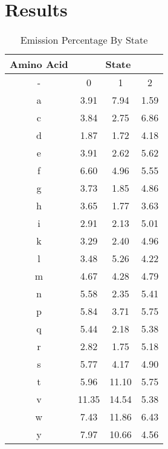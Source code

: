 \documentclass[a4paper,11pt]{article}
\begin{document}
\section{Results}

\begin{table}[!hbp]
    \centering
    \caption{Emission Percentage By State}
    \vspace{0.5cm}
    \begin{tabular}{|c|c  c  c|}
        \hline
        \textbf{Amino Acid} & \multicolumn{3}{|c|}{\textbf{State}} \\
        \hline
        -  &  0 & 1 & 2 \\
        \hline
        a & 3.91 & 7.94 & 1.59 \\
        \hline
        c & 3.84 & 2.75 & 6.86 \\
        \hline
        d & 1.87 & 1.72 & 4.18 \\
        \hline
        e & 3.91 & 2.62 & 5.62 \\
        \hline
        f & 6.60 & 4.96 & 5.55 \\
        \hline
        g & 3.73 & 1.85 & 4.86 \\
        \hline
        h & 3.65 & 1.77 & 3.63 \\
        \hline
        i & 2.91 & 2.13 & 5.01 \\
        \hline
        k & 3.29 & 2.40 & 4.96 \\
        \hline
        l & 3.48 & 5.26 & 4.22 \\
        \hline
        m & 4.67 & 4.28 & 4.79 \\
        \hline
        n & 5.58 & 2.35 & 5.41 \\
        \hline
        p & 5.84 & 3.71 & 5.75 \\
        \hline
        q & 5.44 & 2.18 & 5.38 \\
        \hline
        r & 2.82 & 1.75 & 5.18 \\
        \hline
        s & 5.77 & 4.17 & 4.90 \\
        \hline
        t & 5.96 & 11.10 & 5.75 \\
        \hline
        v & 11.35 & 14.54 & 5.38 \\
        \hline
        w & 7.43 & 11.86 & 6.43 \\
        \hline
        y & 7.97 & 10.66 & 4.56 \\
        \hline
    \end{tabular}
    \label{emissions}
\end{table}
\end{document}
